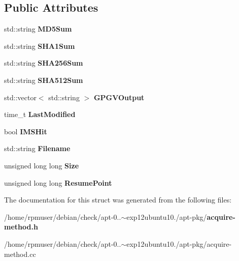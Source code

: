 \subsection*{\-Public \-Attributes}
\begin{DoxyCompactItemize}
\item 
std\-::string {\bfseries \-M\-D5\-Sum}\label{structpkgAcqMethod_1_1FetchResult_a1bb9c96cf88289ef3bbb1f137a8c07cb}

\item 
std\-::string {\bfseries \-S\-H\-A1\-Sum}\label{structpkgAcqMethod_1_1FetchResult_a14ce421b120ad8fc054920ffdc49f33c}

\item 
std\-::string {\bfseries \-S\-H\-A256\-Sum}\label{structpkgAcqMethod_1_1FetchResult_a1ec8fcab1b387a2c6c3a3dd3505700d3}

\item 
std\-::string {\bfseries \-S\-H\-A512\-Sum}\label{structpkgAcqMethod_1_1FetchResult_aa161ef0a86b9a188a7df83be8c10c531}

\item 
std\-::vector$<$ std\-::string $>$ {\bfseries \-G\-P\-G\-V\-Output}\label{structpkgAcqMethod_1_1FetchResult_a5da17feb96448592e8bafbcb9bf77a72}

\item 
time\-\_\-t {\bfseries \-Last\-Modified}\label{structpkgAcqMethod_1_1FetchResult_a7715b80087dbd228815c1cf9ff5cc166}

\item 
bool {\bfseries \-I\-M\-S\-Hit}\label{structpkgAcqMethod_1_1FetchResult_ae187d769df7a9f266e452c9c1aa04289}

\item 
std\-::string {\bfseries \-Filename}\label{structpkgAcqMethod_1_1FetchResult_a50fe9d306e50e9f356cc024154fd0827}

\item 
unsigned long long {\bfseries \-Size}\label{structpkgAcqMethod_1_1FetchResult_a254f9ca5c1e1232788dedebd142044aa}

\item 
unsigned long long {\bfseries \-Resume\-Point}\label{structpkgAcqMethod_1_1FetchResult_abd497ee7ec5dec08e88b4658730ecf63}

\end{DoxyCompactItemize}


\-The documentation for this struct was generated from the following files\-:\begin{DoxyCompactItemize}
\item 
/home/rpmuser/debian/check/apt-\/0..$\sim$exp12ubuntu10./apt-\/pkg/{\bf acquire-\/method.\-h}\item 
/home/rpmuser/debian/check/apt-\/0..$\sim$exp12ubuntu10./apt-\/pkg/acquire-\/method.\-cc\end{DoxyCompactItemize}

